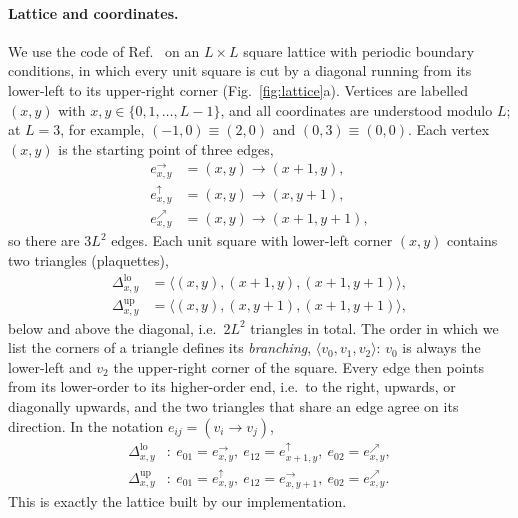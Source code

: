 \documentclass[a4paper]{article}
\newcommand{\eh}[1]{e^{\rightarrow}_{#1}}   %
\newcommand{\ev}[1]{e^{\uparrow}_{#1}}      %
\newcommand{\ed}[1]{e^{\nearrow}_{#1}}      %
\newcommand{\tlo}[1]{\Delta^{\mathrm{lo}}_{#1}}
\newcommand{\tup}[1]{\Delta^{\mathrm{up}}_{#1}}
\begin{document}
\paragraph{Lattice and coordinates.}
We use the code of Ref.~\cite{kobayashi2025clifford} on an $L\times L$ square lattice with periodic boundary conditions, in which every unit square is cut by a diagonal running from its lower-left to its upper-right corner (Fig.~\ref{fig:lattice}a). Vertices are labelled $(x,y)$ with $x,y\in\{0,1,\dots,L-1\}$, and all coordinates are understood modulo $L$; at $L=3$, for example, $(-1,0)\equiv(2,0)$ and $(0,3)\equiv(0,0)$. Each vertex $(x,y)$ is the starting point of three edges,
\begin{align}
  \eh{x,y}&=(x,y)\to(x+1,y), \nonumber\\
  \ev{x,y}&=(x,y)\to(x,y+1), \\
  \ed{x,y}&=(x,y)\to(x+1,y+1),\nonumber
\end{align}
so there are $3L^2$ edges. Each unit square with lower-left corner $(x,y)$ contains two triangles (plaquettes),
\begin{align}
  \tlo{x,y}&=\langle(x,y),(x+1,y),(x+1,y+1)\rangle,\nonumber\\
  \tup{x,y}&=\langle(x,y),(x,y+1),(x+1,y+1)\rangle,
  \label{eq:triangles}
\end{align}
below and above the diagonal, i.e.\ $2L^2$ triangles in total. The order in which we list the corners of a triangle defines its \emph{branching}, $\langle v_0,v_1,v_2\rangle$: $v_0$ is always the lower-left and $v_2$ the upper-right corner of the square. Every edge then points from its lower-order to its higher-order end, i.e.\ to the right, upwards, or diagonally upwards, and the two triangles that share an edge agree on its direction. In the notation $e_{ij}=(v_i\to v_j)$,
\begin{align}
  \tlo{x,y}&:\ e_{01}=\eh{x,y},\ e_{12}=\ev{x+1,y},\ e_{02}=\ed{x,y},\nonumber\\
  \tup{x,y}&:\ e_{01}=\ev{x,y},\ e_{12}=\eh{x,y+1},\ e_{02}=\ed{x,y}.
  \label{eq:triedges}
\end{align}
This is exactly the lattice built by our implementation.
\end{document}
